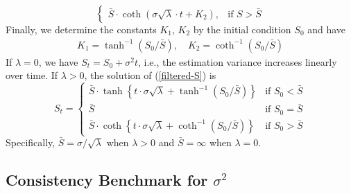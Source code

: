 \documentclass[mnsc]{informs3}
\begin{document}
\begin{APPENDICES}
\begin{equation*}
\begin{cases}
		\bar{S}\cdot\coth(\sigma\sqrt{\lambda}\cdot t + K_2), & \text{if } S>\bar{S}
	\end{cases}
\end{equation*}
Finally, we determine the constants $K_1$, $K_2$ by the initial condition $S_0$ and have
\begin{align*}
	K_1 = \tanh^{-1}(S_0/\bar{S}),\quad
	K_2 = \coth^{-1}(S_0/\bar{S})
\end{align*}
If $\lambda = 0$, we have $S_t = S_0+\sigma^2t$, i.e., the estimation variance increases linearly over time.
If $\lambda > 0$, the solution of (\ref{filtered-S}) is
\begin{equation*}
	S_t =
	\begin{cases}
        \bar{S} \cdot \tanh\left\{t\cdot\sigma\sqrt{\lambda} +  \tanh^{-1}\left(S_0\big/\bar{S}\right)\right\} & \text{if } S_0 < \bar{S} \\
        \bar{S} & \text{if } S_0 = \bar{S} \\
        \bar{S} \cdot \coth\left\{t\cdot\sigma\sqrt{\lambda} +  \coth^{-1}\left(S_0\big/\bar{S}\right)\right\} & \text{if } S_0 > \bar{S}
	\end{cases}
\end{equation*}
Specifically, $\bar{S} = \sigma / \sqrt{\lambda}$ when $\lambda>0$ and $\bar{S} = \infty$ when $\lambda = 0$.


\subsection{Consistency Benchmark for $\sigma^2$}\label{appexidx-normal-benchmark}


\end{APPENDICES}
\end{document}

